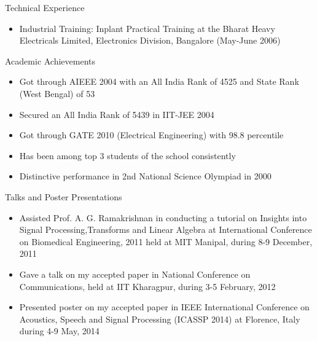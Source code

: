 \documentclass[10pt]{article}
\begin{document}
\begin{cv}
\begin{cvlist}{Technical Experience}
\begin{itemize}
\begin{itemize}
\end{itemize}




\item
Industrial Training:
Inplant Practical Training at the Bharat Heavy
Electricals Limited, Electronics Division, Bangalore
(May-June 2006)


	
\end{itemize}
\end{cvlist}

\begin{cvlist}{Academic Achievements}
\item
\begin{itemize}\itemsep=0.25em
	\item
Got through AIEEE 2004 with an All India Rank of 4525 and State Rank (West Bengal) of 53

\item

 Secured an All India Rank of 5439 in IIT-JEE 2004

\item
Got through GATE 2010 (Electrical Engineering) with 98.8 percentile

\item
Has been among top 3 students of the school consistently

\item
Distinctive performance in 2nd National Science Olympiad in 2000


	\end{itemize}

\end{cvlist}



\begin{cvlist}{Talks and Poster Presentations}
\item
\begin{itemize}
 \item Assisted Prof. A. G. Ramakrishnan in conducting a tutorial on Insights into Signal Processing,Transforms and Linear Algebra at International Conference on Biomedical Engineering, 2011 held at MIT Manipal, during 8-9 December, 2011


\item 

Gave a talk on my accepted paper in  National Conference on Communications,  held at IIT Kharagpur, during 3-5 February, 2012
\item Presented poster on my accepted paper in IEEE International Conference on Acoustics, Speech and Signal Processing (ICASSP 2014) at Florence, Italy  during  4-9 May, 2014


\end{itemize}
\end{cvlist}
\end{cv}
\end{document}
